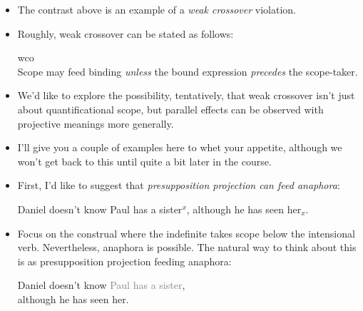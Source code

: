 \documentclass[nols,twoside,nofonts,nobib,nohyper]{tufte-handout}
\begin{document}
\begin{itemize}
\begin{fullwidth}
\begin{multicols}{2}
     \ex
     Every student$&^i$'s mother adores their$_{i}$ advisor.
     \xe

     \columnbreak

     \ex~
     \ljudge{*}Their$_{i}$ advisor adores every student$^{i}$'s mother.
     \xe

     \end{multicols}
     \end{fullwidth}

     \item The contrast above is an example of a \textit{weak crossover} violation.

   \item Roughly, weak crossover can be stated as follows:

     \ex \acf{wco}\\
     Scope may feed binding \textit{unless} the bound expression
     \textit{precedes} the scope-taker.
     \xe

    \item We'd like to explore the possibility, tentatively, that weak crossover
    isn't just about quantificational scope, but parallel effects can be
    observed with projective meanings more generally.

    \item I'll give you a couple of examples here to whet your appetite,
    although we won't get back to this until quite a bit later in the course.

    \item First, I'd like to suggest that \textit{presupposition projection can
    feed anaphora}:

    \ex
    Daniel doesn't know Paul has a sister$^{x}$, although he has seen her$_{x}$.
    \xe

    \item Focus on the construal where the indefinite takes scope below the
    intensional verb. Nevertheless, anaphora is possible. The natural way to
    think about this is as presupposition projection feeding
    anaphora:

    \ex
     Daniel doesn't know \textcolor{gray}{Paul has a
    sister},\\
    although he has seen her.
    \xe


\end{itemize}
\end{document}
